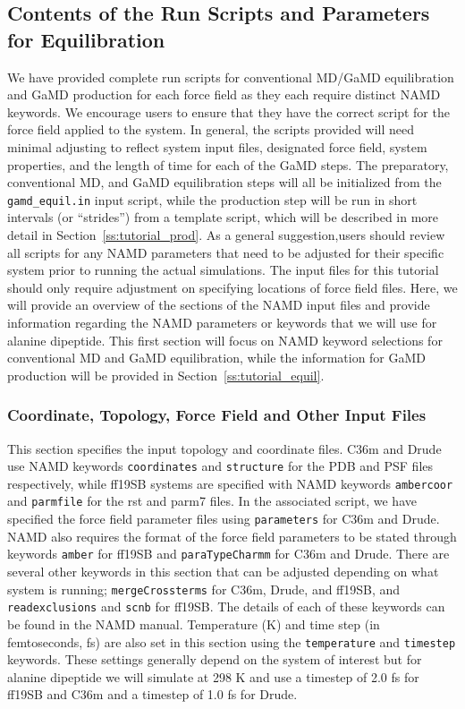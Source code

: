 \documentclass[9pt,tutorial,pubversion]{livecoms}
\begin{document}
\subsection{Contents of the Run Scripts and Parameters for Equilibration} 
We have provided complete run scripts for conventional MD/GaMD equilibration and GaMD production for each force field as they each require distinct NAMD keywords. We encourage users to ensure that they have the correct script for the force field applied to the system. In general, the scripts provided will need minimal adjusting to reflect system input files, designated force field, system properties, and the length of time for each of the GaMD steps. The preparatory, conventional MD, and GaMD equilibration steps will all be initialized from the \texttt{gamd\_equil.in} input script, while the production step will be run in short intervals (or ``strides'') from a template script, which will be described in more detail in Section~\ref{ss:tutorial_prod}. As a general suggestion,users should review all scripts for any NAMD parameters that need to be adjusted for their specific system prior to running the actual simulations. The input files for this tutorial should only require adjustment on specifying locations of force field files. Here, we will provide an overview of the sections of the NAMD input files and provide information regarding the NAMD parameters or keywords that we will use for alanine dipeptide. This first section will focus on NAMD keyword selections for conventional MD and GaMD equilibration, while the information for GaMD production will be provided in Section~\ref{ss:tutorial_equil}. 

\subsubsection{Coordinate, Topology, Force Field and Other Input Files}
This section specifies the input topology and coordinate files. C36m and Drude use NAMD keywords \texttt{coordinates} and \texttt{structure} for the PDB and PSF files respectively, while ff19SB systems are specified with NAMD keywords \texttt{ambercoor} and \texttt{parmfile} for the rst and parm7 files. In the associated script, we have specified the force field parameter files using \texttt{parameters} for C36m and Drude. NAMD also requires the format of the force field parameters to be stated through keywords \texttt{amber} for ff19SB and \texttt{paraTypeCharmm} for C36m and Drude. There are several other keywords in this section that can be adjusted depending on what system is running; \texttt{mergeCrossterms} for C36m, Drude, and ff19SB, and \texttt{readexclusions} and \texttt{scnb} for ff19SB. The details of each of these keywords can be found in the NAMD manual. Temperature (K) and time step (in femtoseconds, fs) are also set in this section using the \texttt{temperature} and \texttt{timestep} keywords. These settings generally depend on the system of interest but for alanine dipeptide we will simulate at 298 K and use a timestep of 2.0 fs for ff19SB and C36m and a timestep of 1.0 fs for Drude. 
\end{document}
